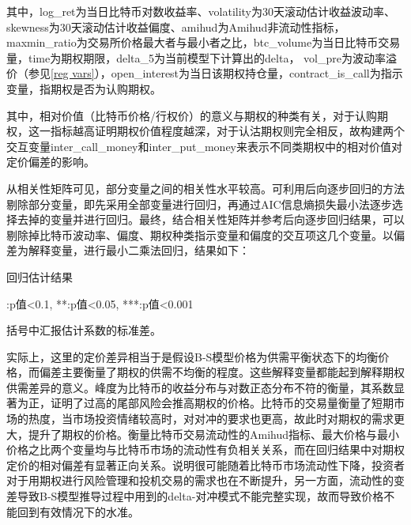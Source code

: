     \newpage
\restoregeometry
其中，log\_ret为当日比特币对数收益率、volatility为30天滚动估计收益波动率、skewness为30天滚动估计收益偏度、amihud为Amihud非流动性指标，maxmin\_ratio为交易所价格最大者与最小者之比，btc\_volume为当日比特币交易量，time为期权期限，delta\_5为当前模型下计算出的delta，
vol\_pre为波动率溢价（参见\ref{reg vars}），open\_interest为当日该期权持仓量，contract\_is\_call为指示变量，指期权是否为认购期权。
\par{其中，相对价值（比特币价格/行权价）的意义与期权的种类有关，对于认购期权，这一指标越高证明期权价值程度越深，对于认沽期权则完全相反，故构建两个交互变量inter\_call\_money和inter\_put\_money来表示不同类期权中的相对价值对定价偏差的影响。}
\par{从相关性矩阵可见，部分变量之间的相关性水平较高。可利用后向逐步回归的方法剔除部分变量，即先采用全部变量进行回归，再通过AIC信息熵损失最小法逐步选择去掉的变量并进行回归。最终，结合相关性矩阵并参考后向逐步回归结果，可以剔除掉比特币波动率、偏度、期权种类指示变量和偏度的交互项这几个变量。以偏差为解释变量，进行最小二乘法回归，结果如下：}
\newpage
{}
\begin{center}
    \begin{threeparttable}[H]

        \caption{回归估计结果}
        
        
        \begin{tablenotes}
            \footnotesize
            \item *:p值<0.1, **:p值<0.05, ***:p值<0.001
            \item 括号中汇报估计系数的标准差。
        \end{tablenotes}
    \end{threeparttable}
\end{center}
\newpage
\restoregeometry
\par{
实际上，这里的定价差异相当于是假设B-S模型价格为供需平衡状态下的均衡价格，而偏差主要衡量了期权的供需不均衡的程度。这些解释变量都能起到解释期权供需差异的意义。峰度为比特币的收益分布与对数正态分布不符的衡量，其系数显著为正，证明了过高的尾部风险会推高期权的价格。比特币的交易量衡量了短期市场的热度，当市场投资情绪较高时，对对冲的要求也更高，故此时对期权的需求更大，提升了期权的价格。衡量比特币交易流动性的Amihud指标、最大价格与最小价格之比两个变量均与比特币市场的流动性有负相关关系，而在回归结果中对期权定价的相对偏差有显著正向关系。说明很可能随着比特币市场流动性下降，投资者对于用期权进行风险管理和投机交易的需求也在不断提升，另一方面，流动性的变差导致B-S模型推导过程中用到的delta-对冲模式不能完整实现，故而导致价格不能回到有效情况下的水准。
}
